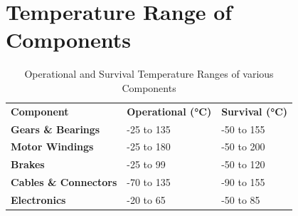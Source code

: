 \section{Temperature Range of Components}
\label{app:optemp}
\begin{table}[H]
\caption[Operational and Survival Temperature Ranges of various Components]{Operational and Survival Temperature Ranges of various Components \cite{NASAsysreq_Kumar}}
\centering
\begin{tabular}{|l|l|l|}
\hline
\textbf{Component}	&	\textbf{Operational (\si{\degreeCelsius})}	&	\textbf{Survival (\si{\degreeCelsius})}\\\hhline{|=|=|=|}
\textbf{Gears \& Bearings}		&	-25 to 135	&	-50 to 155	\\\hline
\textbf{Motor Windings}			&	-25 to 180	&	-50 to 200	\\\hline
\textbf{Brakes}					&	-25 to 99	&	-50 to 120	\\\hline
\textbf{Cables \& Connectors}	&	-70 to 135	&	-90 to 155	\\\hline
\textbf{Electronics}			&	-20 to 65	&	-50 to 85	\\\hline
\end{tabular}
\end{table}

